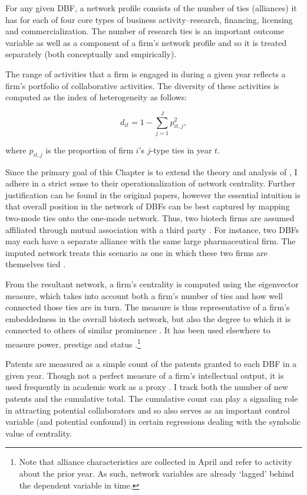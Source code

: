 For any given DBF, a network profile consists of the number of ties (alliances) it has for each of four core types of business activity--research, financing, licensing and commercialization. The number of research ties is an important outcome variable as well as a component of a firm's network profile and so it is treated separately (both conceptually and empirically). 

The range of activities that a firm is engaged in during a given year reflects a firm's portfolio of collaborative activities. The diversity of these activities is computed as the \citet{blau1977} index of heterogeneity as follows: 

\begin{equation}
d_{it}=1-\sum_{j=1}^Jp_{it,j}^2,
\end{equation}

\noindent where $p_{it,j}$ is the proportion of firm $i$'s $j$-type ties in year $t$.
 
Since the primary goal of this Chapter is to extend the theory and analysis of \citet{powell1999}, I adhere in a strict sense to their operationalization of network centrality. Further justification can be found in the original papers, however the essential intuition is that overall position in the network of DBFs can be best captured by mapping two-mode ties onto the one-mode network. Thus, two biotech firms are assumed affiliated through mutual association with a third party \citep[e.g.][]{breiger1974}. For instance, two DBFs may each have a separate alliance with the same large pharmaceutical firm. The imputed network treats this scenario as one in which these two firms are themselves tied \citep[cf.][]{powell1996}.

From the resultant network, a firm's centrality is computed using the \citet{bonacich1972} eigenvector measure, which takes into account both a firm's number of ties and how well connected those ties are in turn. The measure is thus representative of a firm's embeddedness in the overall biotech network, but also the degree to which it is connected to others of similar prominence \citep{podolny2001}. It has been used elsewhere to measure power, prestige and status \citep{burt1982, baker1998}.\footnote{Note that alliance characteristics are collected in April and refer to activity about the prior year. As such, network variables are already `lagged' behind the dependent variable in time.}

Patents are measured as a simple count of the patents granted to each DBF in a given year. Though not a perfect measure of a firm's intellectual output, it is used frequently in academic work as a proxy \citep[cf.][]{powell1999, trajtenberg1990}. I track both the number of new patents and the cumulative total. The cumulative count can play a signaling role in attracting potential collaborators \citep[e.g.][]{smith1999} and so also serves as an important control variable (and potential confound) in certain regressions dealing with the symbolic value of centrality. 

